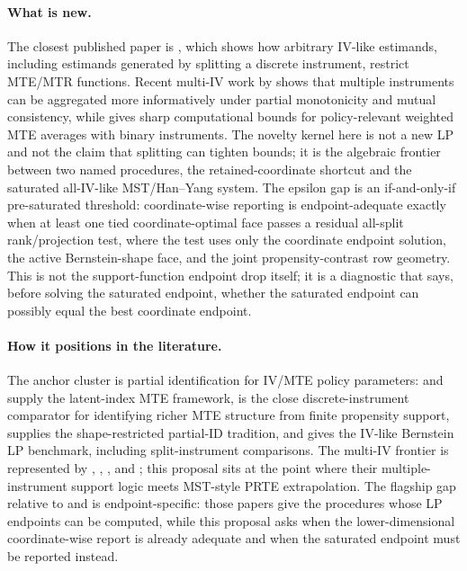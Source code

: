 \documentclass[11pt]{article}
\theoremstyle{definition}
\theoremstyle{plain}
\theoremstyle{remark}
\begin{document}
\paragraph{What is new.}
The closest published paper is \citet{MogstadSantosTorgovitsky2018}, which
shows how arbitrary IV-like estimands, including estimands generated by
splitting a discrete instrument, restrict MTE/MTR functions.  Recent multi-IV
work by \citet{MogstadTorgovitskyWalters2024} shows that multiple instruments
can be aggregated more informatively under partial monotonicity and mutual
consistency, while \citet{HanYang2024} gives sharp computational bounds for
policy-relevant weighted MTE averages with binary instruments.  The novelty
kernel here is not a new LP and not the claim that splitting can tighten
bounds; it is the algebraic frontier between two named procedures, the
retained-coordinate shortcut and the saturated all-IV-like MST/Han--Yang
system.  The epsilon gap is an if-and-only-if pre-saturated threshold:
coordinate-wise reporting is endpoint-adequate exactly when at least one tied
coordinate-optimal face passes a residual all-split rank/projection test,
where the test uses only the coordinate endpoint solution, the active
Bernstein-shape face, and the joint propensity-contrast row geometry.  This is
not the support-function endpoint drop itself; it is a diagnostic that says,
before solving the saturated endpoint, whether the saturated endpoint can
possibly equal the best coordinate endpoint.

\paragraph{How it positions in the literature.}
The anchor cluster is partial identification for IV/MTE policy parameters:
\citet{HeckmanVytlacil2005} and \citet{Vytlacil2002} supply the latent-index
MTE framework, \citet{BrinchMogstadWiswall2017} is the close
discrete-instrument comparator for identifying richer MTE structure from
finite propensity support, \citet{ManskiPepper2000} supplies the
shape-restricted partial-ID tradition, and
\citet{MogstadSantosTorgovitsky2018} gives the IV-like Bernstein LP
benchmark, including split-instrument comparisons.  The multi-IV frontier is represented by
\citet{MogstadTorgovitskyWalters2021}, \citet{MogstadTorgovitskyWalters2024},
\citet{Goff2024}, and \citet{HanYang2024}; this proposal sits at the point
where their multiple-instrument support logic meets MST-style PRTE
extrapolation.  The flagship gap relative to
\citet{MogstadSantosTorgovitsky2018} and \citet{HanYang2024} is
endpoint-specific: those papers give the procedures whose LP endpoints can be
computed, while this proposal asks when the lower-dimensional
coordinate-wise report is already adequate and when the saturated endpoint
must be reported instead.
\end{document}
